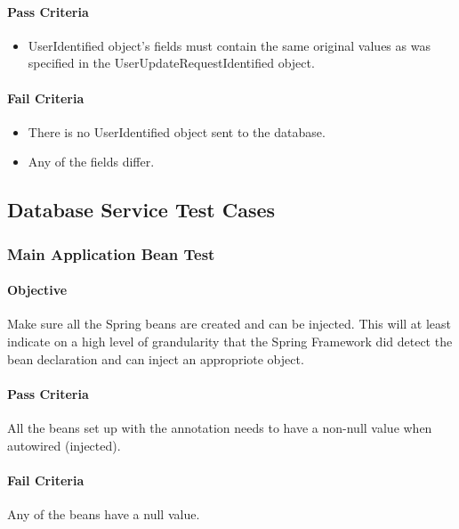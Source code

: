 \documentclass[hidelinks,english]{article}
\begin{document}
				\paragraph{Pass Criteria}
				\begin{itemize}
					\item UserIdentified object's fields must contain the same original values as was specified in the UserUpdateRequestIdentified object.
				\end{itemize}
				\paragraph{Fail Criteria}
				\begin{itemize}
					\item There is no UserIdentified object sent to the database.
					\item Any of the fields differ.
				\end{itemize}
				
		\subsection{Database Service Test Cases}
			\subsubsection{Main Application Bean Test}\label{databaseapplicationbeanstest}
				\paragraph{Objective} Make sure all the Spring beans are created and can be injected. This will at least indicate on a high level of grandularity that the Spring Framework did detect the bean declaration and can inject an appropriote object.
				\paragraph{Pass Criteria} All the beans set up with the \emph{\@Bean} annotation needs to have a non-null value when autowired (injected).
				\paragraph{Fail Criteria} Any of the beans have a null value.
		
\end{document}
